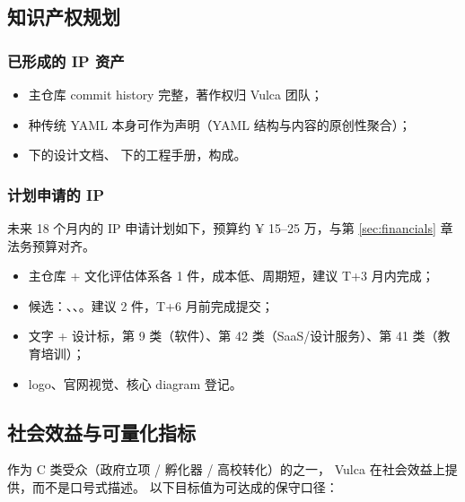 \subsection{知识产权规划}

\subsubsection*{已形成的 IP 资产}
\begin{itemize}
  \item {}\quad 主仓库 commit history 完整，著作权归 Vulca 团队；
  \item {} 种传统 YAML 本身可作为声明（YAML 结构与内容的原创性聚合）；
  \item {}\quad {} 下的设计文档、 下的工程手册，构成。
\end{itemize}

\subsubsection*{计划申请的 IP}

未来 18 个月内的 IP 申请计划如下，预算约 ¥ 15–25 万，与第 \ref{sec:financials} 章法务预算对齐。

\begin{itemize}
  \item {}\quad 主仓库 + 文化评估体系各 1 件，成本低、周期短，建议 T+3 月内完成；
  \item {}\quad 候选：、、。建议 2 件，T+6 月前完成提交；
  \item {}\quad {} 文字 + 设计标，第 9 类（软件）、第 42 类（SaaS/设计服务）、第 41 类（教育培训）；
  \item {}\quad logo、官网视觉、核心 diagram 登记。
\end{itemize}

\subsection{社会效益与可量化指标}
\label{sec:ip:social}

作为 C 类受众（政府立项 / 孵化器 / 高校转化）的之一，
Vulca 在社会效益上提供，而不是口号式描述。
以下目标值为可达成的保守口径：

